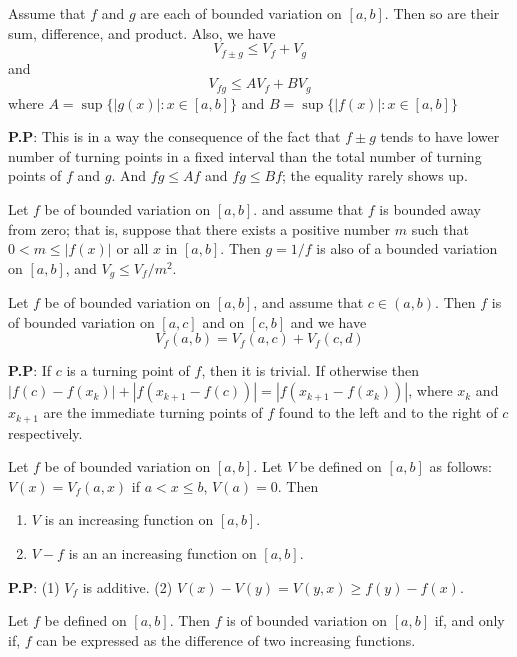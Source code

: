 \documentclass[10pt,a4paper]{book}
\begin{document}
 \begin{Thm}
 Assume that $f$ and $g$ are each of bounded variation on $[a, b]$. Then so are their sum, difference, and product. Also, we have
  $$V_{f \pm g}  \leq V_f + V_g$$
  and
  $$V_{fg} \leq AV_f + BV_g$$
  where $A = \sup \{|g(x)|: x \in [a,b]\}$ and $B = \sup \{|f(x)|: x \in [a,b]\}$
  
  
 \end{Thm}
 \noindent \textbf{P.P}: This is in a way the consequence of the fact that $f\pm g$ tends to have lower number of turning points in a fixed interval than the total number of turning points of $f$ and $g$. And $fg \leq Af$ and $fg \leq Bf$; the equality rarely shows up.
 
 \begin{Thm}
 Let $f$ be of bounded variation on $[a, b]$. and assume that $f$ is bounded away from zero; that is, suppose that there exists a positive number $m$ such that $0 < m \leq |f(x)|$ or all $x$ in $[a, b]$. Then $g= 1/f$ is also of a bounded variation on $[a,b]$, and $V_g \leq V_f / m^2$. 
 \end{Thm}
 
 \begin{Thm}
 Let $f$ be of bounded variation on $[a, b]$, and assume that $c \in (a, b)$. Then $f$ is of bounded variation on $[a, c]$ and on $[c, b]$ and we have
 $$V_f(a,b) = V_f(a,c) + V_f(c,d)$$
 \end{Thm}
 \noindent \textbf{P.P}:  If $c$ is a turning point of $f$, then it is trivial. If otherwise then $|f(c) - f(x_k)| + |f(x_{k+1} - f(c))| = |f(x_{k+1} - f(x_k))|$, where $x_k$ and $x_{k+1}$ are the immediate turning points of $f$ found to the left and to the right of $c$ respectively.
 
 \begin{Thm}
 Let $f$ be of bounded variation on $[a, b]$. Let $V$ be defined on $[a, b]$ as follows: $V(x) = V_f(a, x)$ if $a < x \leq b$, $V(a) = 0$. Then
 \begin{enumerate}
     \item $V$ is an increasing function on $[a,b]$.
     \item  $V-f$ is an an increasing function on $[a,b]$.
 \end{enumerate}
 
 
 \end{Thm}
 \noindent \textbf{P.P}: (1) $V_f$ is additive. (2) $V(x) - V(y) = V(y,x) \geq f(y) - f(x)$.
 
 \begin{Thm}
  Let $f$ be defined on $[a, b]$. Then $f$ is of bounded variation on $[a, b]$ if, and only if, $f$ can be expressed as the difference of two increasing functions.
 \end{Thm}
 
\end{document}
